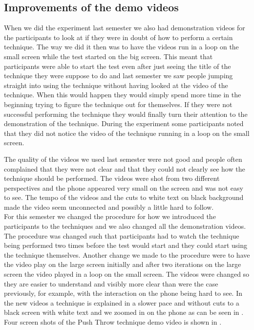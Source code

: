 \subsection*{Improvements of the demo videos}\label{sec:videoslastsemester}
When we did the experiment last semester we also had demonstration videos for the participants to look at if they were in doubt of how to perform a certain technique.
The way we did it then was to have the videos run in a loop on the small screen while the test started on the big screen.
This meant that participants were able to start the test even after just seeing the title of the technique they were suppose to do and last semester we saw people jumping straight into using the technique without having looked at the video of the technique. 
When this would happen they would simply spend more time in the beginning trying to figure the technique out for themselves.
If they were not successful performing the technique they would finally turn their attention to the demonstration of the technique.
During the experiment some participants noted that they did not notice the video of the technique running in a loop on the small screen.

The quality of the videos we used last semester were not good and people often complained that they were not clear and that they could not clearly see how the technique should be performed.
The videos were shot from two different perspectives and the phone appeared very small on the screen and was not easy to see.
The tempo of the videos and the cuts to white text on black background made the video seem unconnected and possibly a little hard to follow.\\

For this semester we changed the procedure for how we introduced the participants to the techniques and we also changed all the demonstration videos.
The procedure was changed such that participants had to watch the technique being performed two times before the test would start and they could start using the technique themselves.
Another change we made to the procedure were to have the video play on the large screen initially and after two iterations on the large screen the video played in a loop on the small screen.
The videos were changed so they are easier to understand and visibly more clear than were the case previously, for example, with the interaction on the phone being hard to see.
In the new videos a technique is explained in a slower pace and without cuts to a black screen with white text and we zoomed in on the phone as can be seen in .
Four screen shots of the Push Throw technique demo video is shown in .

